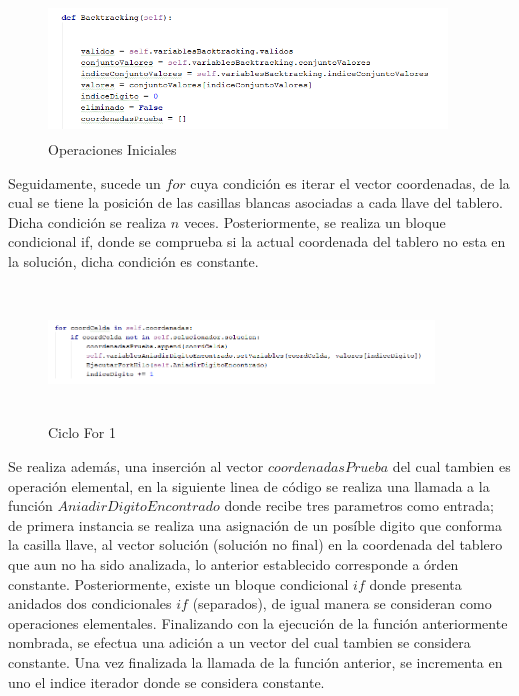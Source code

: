 \documentclass[journal]{IEEEtran}
\begin{document}
\begin{itemize}
		\begin{figure}[h]
		 	\centering
		 	\includegraphics[height= 100pt, width=300pt]{BTVariablesIniciales.png}
		 	\caption{Operaciones Iniciales}
		 \end{figure}
	 
		Seguidamente, sucede un $for$ cuya condición es iterar el vector coordenadas, de la cual se tiene la posición de las casillas blancas asociadas a cada llave del tablero. Dicha condición se realiza $n$ veces. Posteriormente, se realiza un bloque condicional if, donde se comprueba si la actual coordenada del tablero no esta en la solución, dicha condición es constante. 
		
		\begin{figure}[h]
			\centering
			\includegraphics[height= 100pt, width=290pt]{BTFor1.png}
			\caption{Ciclo For 1}
		\end{figure}
		
		Se realiza además, una inserción al vector $coordenadasPrueba$ del cual tambien es operación elemental, en la siguiente linea de código se realiza una llamada a la función $AniadirDigitoEncontrado$ donde recibe tres parametros como entrada; de primera instancia se realiza una asignación de un posíble digito que conforma la casilla llave, al vector solución (solución no final) en la coordenada del tablero que aun no ha sido analizada, lo anterior establecido corresponde a órden constante. Posteriormente, existe un bloque condicional $if$ donde presenta anidados dos condicionales $if$ (separados), de igual manera se consideran como operaciones elementales. Finalizando con la ejecución de la función anteriormente nombrada, se efectua una adición a un vector del cual tambien se considera constante. Una vez finalizada la llamada de la función anterior, se incrementa en uno el indice iterador donde se considera constante.
			

\end{itemize}
\end{document}
